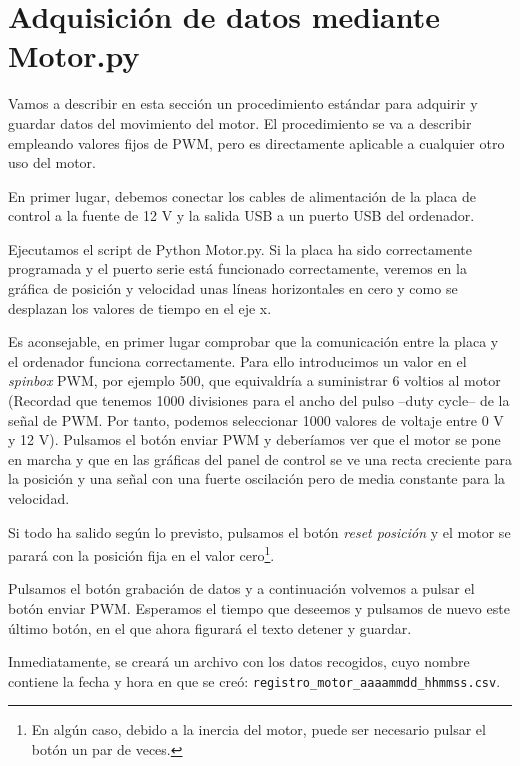 \documentclass[10pt,a4paper]{report}
\begin{document}
\section{Adquisición de datos mediante Motor.py}


Vamos a describir en esta sección un procedimiento estándar para adquirir y guardar datos del movimiento del motor. El procedimiento se va a describir empleando valores fijos de PWM, pero es directamente aplicable a cualquier otro uso del motor.

En primer lugar, debemos conectar los cables de alimentación de la placa de control a la fuente de 12 V y la salida USB a un puerto USB del ordenador. 

Ejecutamos el script de Python Motor.py. Si la placa ha sido correctamente programada y el puerto serie está funcionado correctamente, veremos en la gráfica de posición y velocidad unas líneas horizontales en cero y como se desplazan los valores de tiempo en el eje x.

Es aconsejable, en primer lugar comprobar que la comunicación entre la placa y el ordenador funciona correctamente. Para ello introducimos un valor en el \emph{spinbox} PWM, por ejemplo 500, que equivaldría a suministrar 6 voltios al motor (Recordad que tenemos 1000 divisiones para el ancho del pulso --duty cycle-- de la señal de PWM. Por tanto, podemos seleccionar 1000 valores de voltaje entre 0 V y 12 V). Pulsamos el botón enviar PWM y deberíamos ver que el motor se pone en marcha y que en las gráficas del panel de control se ve una recta creciente para la posición y una señal con una fuerte oscilación pero de media constante para la velocidad.

Si todo ha salido según lo previsto, pulsamos el botón \emph{reset posición} y el motor se parará con la posición fija en el valor cero\footnote{En algún caso, debido a la inercia del motor, puede ser necesario pulsar el botón un par de veces.}.

Pulsamos el botón grabación de datos y a continuación volvemos a pulsar el botón enviar PWM. Esperamos el tiempo que deseemos y pulsamos de nuevo este último botón, en el que ahora figurará el texto detener y guardar.

Inmediatamente, se creará un archivo con los datos recogidos, cuyo nombre contiene la fecha y hora en que se creó: \texttt{registro\_motor\_aaaammdd\_hhmmss.csv}.
\end{document}

